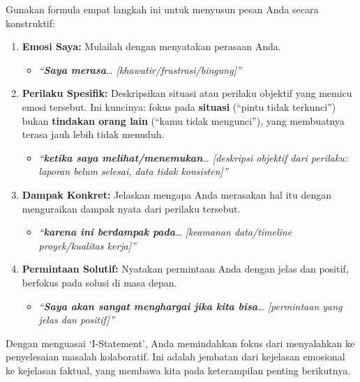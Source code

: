 \documentclass[
  letterpaper,
  DIV=11,
  numbers=noendperiod]{scrreprt}
\providecommand{\tightlist}{%
  \setlength{\itemsep}{0pt}\setlength{\parskip}{0pt}}
\begin{document}
Gunakan formula empat langkah ini untuk menyusun pesan Anda secara
konstruktif:

\begin{enumerate}
\def\labelenumi{\arabic{enumi}.}
\item
  \textbf{Emosi Saya:} Mulailah dengan menyatakan perasaan Anda.

  \begin{itemize}
  \tightlist
  \item
    \emph{``\textbf{Saya merasa}\ldots{}
    {[}khawatir/frustrasi/bingung{]}''}
  \end{itemize}
\item
  \textbf{Perilaku Spesifik:} Deskripsikan situasi atau perilaku
  objektif yang memicu emosi tersebut. Ini kuncinya: fokus pada
  \textbf{situasi} (``pintu tidak terkunci'') bukan \textbf{tindakan
  orang lain} (``kamu tidak mengunci''), yang membuatnya terasa jauh
  lebih tidak menuduh.

  \begin{itemize}
  \tightlist
  \item
    \emph{``\textbf{ketika saya melihat/menemukan}\ldots{} {[}deskripsi
    objektif dari perilaku: laporan belum selesai, data tidak
    konsisten{]}''}
  \end{itemize}
\item
  \textbf{Dampak Konkret:} Jelaskan mengapa Anda merasakan hal itu
  dengan menguraikan dampak nyata dari perilaku tersebut.

  \begin{itemize}
  \tightlist
  \item
    \emph{``\textbf{karena ini berdampak pada}\ldots{} {[}keamanan
    data/timeline proyek/kualitas kerja{]}''}
  \end{itemize}
\item
  \textbf{Permintaan Solutif:} Nyatakan permintaan Anda dengan jelas dan
  positif, berfokus pada solusi di masa depan.

  \begin{itemize}
  \tightlist
  \item
    \emph{``\textbf{Saya akan sangat menghargai jika kita bisa}\ldots{}
    {[}permintaan yang jelas dan positif{]}''}
  \end{itemize}
\end{enumerate}

Dengan menguasai `I-Statement', Anda memindahkan fokus dari menyalahkan
ke penyelesaian masalah kolaboratif. Ini adalah jembatan dari kejelasan
emosional ke kejelasan faktual, yang membawa kita pada keterampilan
penting berikutnya.
\end{document}
